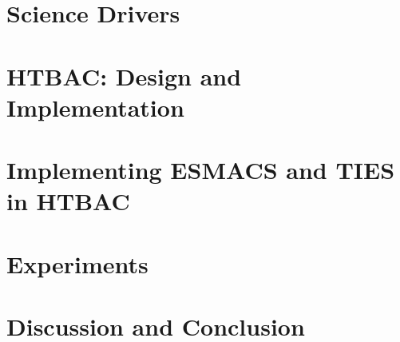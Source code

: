 \documentclass[conference]{IEEEtran}
\begin{document}
\section{Science Drivers}
\label{sec:science-drivers}




\section{HTBAC: Design and Implementation}
\label{sec:htbac}


\section{Implementing ESMACS and TIES in HTBAC}
\label{sec:implementation_htbac}




\section{Experiments}
\label{sec:experiments}



\section{Discussion and Conclusion}
\label{sec:discussion}


\newpage



\end{document}
